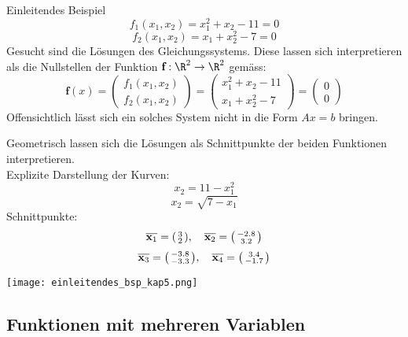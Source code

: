 \begin{example2}{Einleitendes Beispiel}
    $$f_1(x_1, x_2) = x_1^2 + x_2 - 11 = 0$$
    $$f_2(x_1, x_2) = x_1 + x_2^2 - 7 = 0$$
    Gesucht sind die Lösungen des Gleichungssystems. Diese lassen sich interpretieren als die Nullstellen der Funktion $\textbf{f}: \R^2 \to \R^2$ gemäss:
    $$\textbf{f}(x) = \begin{pmatrix} f_1 (x_1, x_2) \\ f_2 (x_1, x_2) \end{pmatrix} = \begin{pmatrix} x_1^2 + x_2 - 11 \\ x_1 + x_2^2 - 7 \end{pmatrix} = \begin{pmatrix} 0\\ 0 \end{pmatrix}$$
    Offensichtlich lässt sich ein solches System nicht in die Form $Ax = b$ bringen. 

    \begin{minipage}{0.5\linewidth}
    Geometrisch lassen sich die Lösungen als Schnittpunkte der beiden Funktionen interpretieren.\\
    Explizite Darstellung der Kurven:
    $$x_2 = 11 - x_1^2$$
    $$x_2 = \sqrt{7 - x_1}$$
    Schnittpunkte:
    $$\overline{\textbf{x}_1} = \begin{psmallmatrix} 3 \\ 2 \end{psmallmatrix}, \quad \overline{\textbf{x}_2} = \begin{psmallmatrix} -2.8 \\ 3.2 \end{psmallmatrix}$$
    $$\overline{\textbf{x}_3} = \begin{psmallmatrix} -3.8 \\ -3.3 \end{psmallmatrix}, \quad \overline{\textbf{x}_4} = \begin{psmallmatrix} 3.4 \\ -1.7 \end{psmallmatrix}$$
    \end{minipage}
    \begin{minipage}{0.5\linewidth}
    \texttt{[image: einleitendes\_bsp\_kap5.png]}
    \end{minipage}
\end{example2}

\subsection{Funktionen mit mehreren Variablen}

